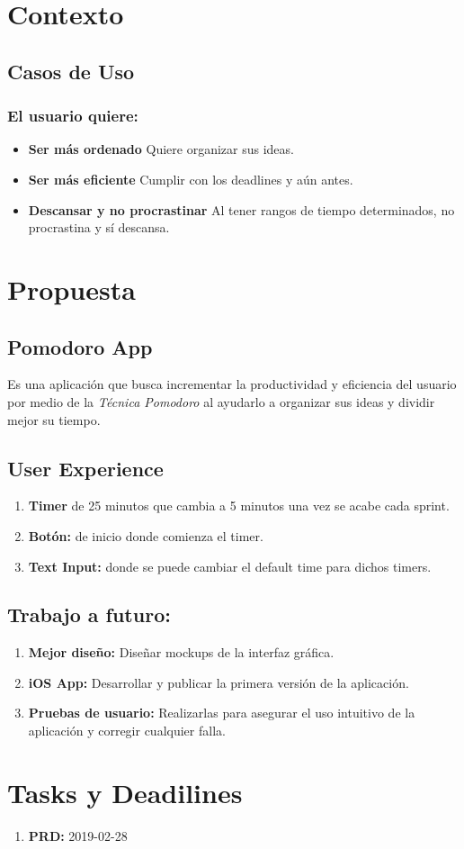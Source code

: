 \documentclass[]{article}
\begin{document}
\section{Contexto}
\subsection{Casos de Uso}
\subsubsection{El usuario quiere:}
\begin{itemize}
	\item \textbf{Ser más ordenado}
	\subitem Quiere organizar sus ideas.
	\item \textbf{Ser más eficiente}
	\subitem Cumplir con los deadlines y aún antes.
	\item \textbf{Descansar y no procrastinar}
	\subitem Al tener rangos de tiempo determinados, no procrastina y sí descansa.
\end{itemize}
	
\section{Propuesta}
\subsection{Pomodoro App}
\par Es una aplicación que busca incrementar la productividad y eficiencia del usuario por medio de la \textit{Técnica Pomodoro} al ayudarlo a organizar sus ideas y dividir mejor su tiempo.
\subsection{User Experience}
\begin{enumerate}
	\item \textbf{Timer} de 25 minutos que cambia a 5 minutos una vez se acabe cada sprint.
	\item \textbf{Botón:} de inicio donde comienza el timer.
	\item \textbf{Text Input:} donde se puede cambiar el default time para dichos timers.
\end{enumerate}
\subsection{Trabajo a futuro:}
\begin{enumerate}
	\item \textbf{Mejor diseño:} Diseñar mockups de la interfaz gráfica.
	\item \textbf{iOS App:} Desarrollar y publicar la primera versión de la aplicación.
	\item \textbf{Pruebas de usuario:} Realizarlas para asegurar el uso intuitivo de la aplicación y corregir cualquier falla.
\end{enumerate}
\section{Tasks y Deadilines}
\begin{enumerate}
	\item \textbf{PRD:} 2019-02-28
\end{enumerate}
\end{document}
